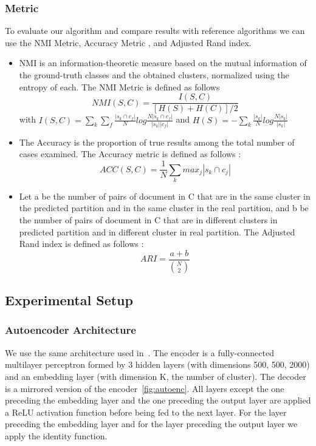 \subsubsection{\label{seq:metric}Metric}
To evaluate our algorithm and compare results with reference algorithms we can
use the NMI Metric, Accuracy Metric \cite{NMI_ACC}, and Adjusted
Rand index\cite{ARI}. 
\begin{itemize}
\item NMI is an information-theoretic measure based on the mutual information of the ground-truth classes
and the obtained clusters, normalized using the entropy of each. The NMI Metric is defined as follows
$$NMI(S,C) = \frac{I(S,C)}{[H(S)+H(C)]/2}$$ 
with
$I(S,C) =\sum\limits_k \sum\limits_f\frac{|s_k \cap c_f|}{N}log\frac{N|s_k \cap c_f|}{|s_k| |c_f|}$
and
$H(S) = -\sum\limits_k\frac{|s_k|}{N}log\frac{N|s_k|}{|s_k|}$
\item The Accuracy is the proportion of true results among the total
  number of cases examined. The Accuracy metric is defined as follows :
$$
ACC(S,C) = \frac{1}{N}\sum\limits_k {max}_j|s_k \cap c_j|
$$
\item Let a be the number of pairs of document in C
  that are in the same cluster in the predicted partition and in the
  same cluster in the real partition, and b be the number of pairs of
  document in C that are in different clusters in predicted partition
  and in different cluster in real partition.
  The Adjusted Rand index is defined as follows :
  $$ARI = \frac{a+b}{\binom{N}{2}}$$
\end{itemize}
\subsection{Experimental Setup}
\subsubsection{Autoencoder Architecture}
We use the same architecture used in~\cite{Deap-K-Means}. The encoder is a fully-connected 
multilayer perceptron formed by 3 hidden layers (with dimensions 500, 500, 2000) 
and an embedding layer (with dimension K, the number of cluster). 
The decoder is a mirrored version of the encoder~\ref{fig:autoenc}.
All layers except the one preceding the embedding layer and the one
preceding the output layer are applied a ReLU activation function \cite{Nair:2010:RLU:3104322.3104425} 
before being fed to the next
layer. For the layer preceding the embedding layer and for the layer preceding the output layer
we apply the identity function.
